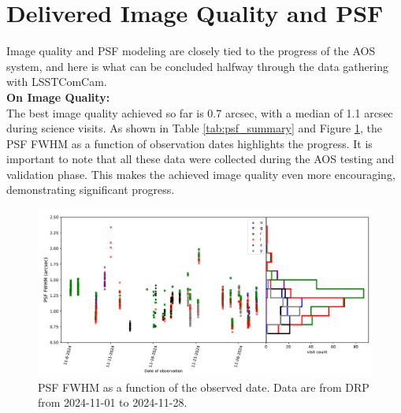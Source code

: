 \section{Delivered Image Quality and PSF}
\label{sec:delivered_image_quality_and_psf}


Image quality and PSF modeling are closely tied to the progress of the AOS system, and here is what can be concluded halfway through the data gathering with LSSTComCam. \\

\textbf{On Image Quality:} \\

The best image quality achieved so far is 0.7 arcsec, with a median of 1.1 arcsec during science visits. As shown in Table \ref{tab:psf_summary} and Figure \ref{seeing_plot}, the PSF FWHM as a function of observation dates highlights the progress. It is important to note that all these data were collected during the AOS testing and validation phase. This makes the achieved image quality even more encouraging, demonstrating significant progress.

\begin{figure}
        \centering
        \includegraphics[width=\textwidth]{figures/seeing}
        \caption{\small PSF FWHM as a function of the observed date. Data are from DRP from 2024-11-01 to 2024-11-28.}
        \label{seeing_plot}
\end{figure}



